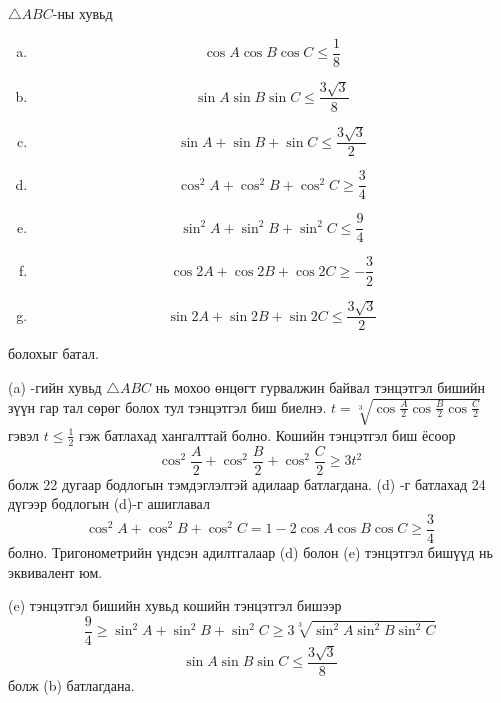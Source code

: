 \documentclass[10pt,a4paper,oneside]{book}
\begin{document}
\Problem
$\triangle ABC$-ны хувьд
\begin{enumerate}[(a)]
\item
\begin{equation*}
\cos A \cos B \cos C \leq \frac{1}{8}
\end{equation*}
\item
\begin{equation*}
\sin A \sin B \sin C \leq \frac{3\sqrt{3}}{8}
\end{equation*}
\item
\begin{equation*}
\sin A + \sin B + \sin C \leq \frac{3\sqrt{3}}{2}
\end{equation*}
\item
\begin{equation*}
\cos^2 A + \cos^2 B + \cos^2 C \geq \frac{3}{4}
\end{equation*}
\item
\begin{equation*}
\sin^2 A + \sin^2 B + \sin^2 C \leq \frac{9}{4}
\end{equation*}
\item
\begin{equation*}
\cos 2A + \cos 2B + \cos 2C \geq -\frac{3}{2}
\end{equation*}
\item
\begin{equation*}
\sin 2A + \sin 2B + \sin 2C \leq \frac{3\sqrt{3}}{2}
\end{equation*}
\end{enumerate}
болохыг батал.

\TheSolution
(a) -гийн хувьд $\triangle ABC$ нь мохоо өнцөгт гурвалжин байвал тэнцэтгэл бишийн зүүн гар тал сөрөг болох тул тэнцэтгэл биш биелнэ.
$t=\sqrt[3]{\cos \frac{A}{2}\cos \frac{B}{2}\cos \frac{C}{2}}$ гэвэл $t\leq \frac{1}{2}$ гэж батлахад хангалттай болно. Кошийн тэнцэтгэл биш ёсоор
\begin{equation*}
\cos^2 \frac{A}{2} + \cos^2 \frac{B}{2} + \cos^2 \frac{C}{2} \geq 3t^2
\end{equation*}
болж 22 дугаар бодлогын тэмдэглэлтэй адилаар батлагдана. (d) -г батлахад 24 дүгээр бодлогын (d)-г ашиглавал 
\begin{equation*}
\cos^2 A + \cos^2 B + \cos^2 C = 1- 2\cos A \cos B \cos C \geq \frac{3}{4}
\end{equation*}
болно. Тригонометрийн үндсэн адилтгалаар (d) болон (e) тэнцэтгэл бишүүд нь эквивалент юм.

(e) тэнцэтгэл бишийн хувьд кошийн тэнцэтгэл бишээр
\begin{equation*}
\frac{9}{4} \geq \sin^2 A + \sin^2 B + \sin^2 C \geq 3\sqrt[3]{\sin^2 A \sin^2 B \sin^2 C}
\end{equation*}
\begin{equation*}
\sin A\sin B \sin C \leq \frac{3\sqrt{3}}{8}
\end{equation*}
болж (b) батлагдана.
\end{document}
